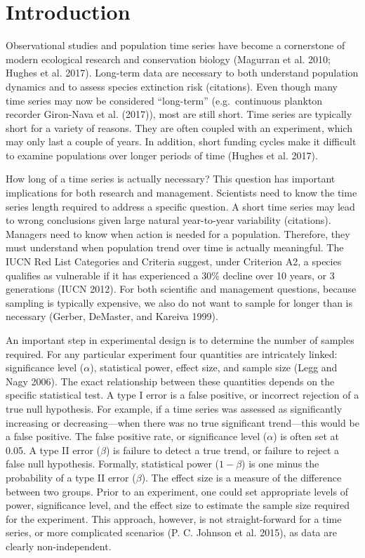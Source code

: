 \documentclass[12pt,]{article}
\begin{document}
\section{Introduction}\label{introduction}

Observational studies and population time series have become a
cornerstone of modern ecological research and conservation biology
(Magurran et al. 2010; Hughes et al. 2017). Long-term data are necessary
to both understand population dynamics and to assess species extinction
risk (citations). Even though many time series may now be considered
``long-term'' (e.g.~continuous plankton recorder Giron-Nava et al.
(2017)), most are still short. Time series are typically short for a
variety of reasons. They are often coupled with an experiment, which may
only last a couple of years. In addition, short funding cycles make it
difficult to examine populations over longer periods of time (Hughes et
al. 2017).

How long of a time series is actually necessary? This question has
important implications for both research and management. Scientists need
to know the time series length required to address a specific question.
A short time series may lead to wrong conclusions given large natural
year-to-year variability (citations). Managers need to know when action
is needed for a population. Therefore, they must understand when
population trend over time is actually meaningful. The IUCN Red List
Categories and Criteria suggest, under Criterion A2, a species qualifies
as vulnerable if it has experienced a 30\% decline over 10 years, or 3
generations (IUCN 2012). For both scientific and management questions,
because sampling is typically expensive, we also do not want to sample
for longer than is necessary (Gerber, DeMaster, and Kareiva 1999).

An important step in experimental design is to determine the number of
samples required. For any particular experiment four quantities are
intricately linked: significance level (\(\alpha\)), statistical power,
effect size, and sample size (Legg and Nagy 2006). The exact
relationship between these quantities depends on the specific
statistical test. A type I error is a false positive, or incorrect
rejection of a true null hypothesis. For example, if a time series was
assessed as significantly increasing or decreasing---when there was no
true significant trend---this would be a false positive. The false
positive rate, or significance level (\(\alpha\)) is often set at 0.05.
A type II error (\(\beta\)) is failure to detect a true trend, or
failure to reject a false null hypothesis. Formally, statistical power
(\(1-\beta\)) is one minus the probability of a type II error
(\(\beta\)). The effect size is a measure of the difference between two
groups. Prior to an experiment, one could set appropriate levels of
power, significance level, and the effect size to estimate the sample
size required for the experiment. This approach, however, is not
straight-forward for a time series, or more complicated scenarios (P. C.
Johnson et al. 2015), as data are clearly non-independent.
\end{document}
